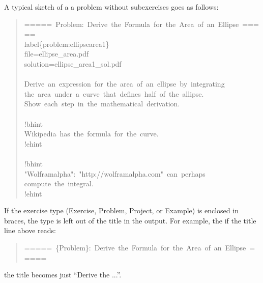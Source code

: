 \documentclass[a4paper]{article}
\begin{document}
A typical sketch of a a problem without subexercises goes as follows:
%
\begin{quote}{\ttfamily \raggedright \noindent
=====~Problem:~Derive~the~Formula~for~the~Area~of~an~Ellipse~=====\\
label\{problem:ellipsearea1\}\\
file=ellipse\_area.pdf\\
solution=ellipse\_area1\_sol.pdf\\
~\\
Derive~an~expression~for~the~area~of~an~ellipse~by~integrating\\
the~area~under~a~curve~that~defines~half~of~the~allipse.\\
Show~each~step~in~the~mathematical~derivation.\\
~\\
!bhint\\
Wikipedia~has~the~formula~for~the~curve.\\
!ehint\\
~\\
!bhint\\
"Wolframalpha":~"http://wolframalpha.com"~can~perhaps\\
compute~the~integral.\\
!ehint
}
\end{quote}

If the exercise type (Exercise, Problem, Project, or Example)
is enclosed in braces, the type is left out of the title in the
output. For example, the if the title line above reads:
%
\begin{quote}{\ttfamily \raggedright \noindent
=====~\{Problem\}:~Derive~the~Formula~for~the~Area~of~an~Ellipse~=====
}
\end{quote}

the title becomes just ``Derive the ...''.
\end{document}
